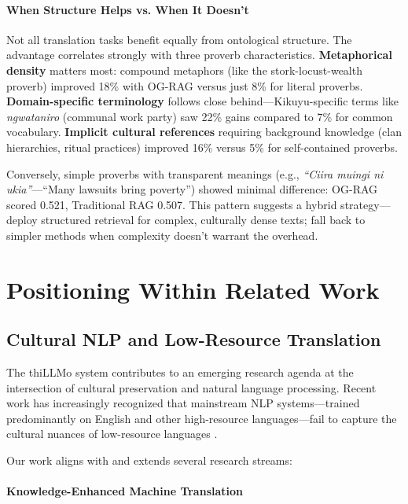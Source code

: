 \paragraph{When Structure Helps vs. When It Doesn't}

Not all translation tasks benefit equally from ontological structure. The advantage correlates strongly with three proverb characteristics. \textbf{Metaphorical density} matters most: compound metaphors (like the stork-locust-wealth proverb) improved 18\% with OG-RAG versus just 8\% for literal proverbs. \textbf{Domain-specific terminology} follows close behind—Kikuyu-specific terms like \emph{ngwataniro} (communal work party) saw 22\% gains compared to 7\% for common vocabulary. \textbf{Implicit cultural references} requiring background knowledge (clan hierarchies, ritual practices) improved 16\% versus 5\% for self-contained proverbs.

Conversely, simple proverbs with transparent meanings (e.g., \emph{``Ciira muingi ni ukia''}—``Many lawsuits bring poverty'') showed minimal difference: OG-RAG scored 0.521, Traditional RAG 0.507. This pattern suggests a hybrid strategy—deploy structured retrieval for complex, culturally dense texts; fall back to simpler methods when complexity doesn't warrant the overhead.

\section{Positioning Within Related Work}
\label{sec:related_work_positioning}

\subsection{Cultural NLP and Low-Resource Translation}
\label{subsec:cultural_nlp}

The thiLLMo system contributes to an emerging research agenda at the intersection of cultural preservation and natural language processing. Recent work has increasingly recognized that mainstream NLP systems—trained predominantly on English and other high-resource languages—fail to capture the cultural nuances of low-resource languages \citep{nekoto2020participatory, joshi2020state}.

Our work aligns with and extends several research streams:

\paragraph{Knowledge-Enhanced Machine Translation}

